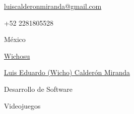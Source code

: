 \documentclass[11pt]{spidercv}
\begin{document}
    \begin{TopBar}{\ColorTextSide}

        \begin{DoubleColumns}
            \begin{ItemList}{\ColorHighlight}
                \item [\Large\faAt] \href{mailto:email@example.com}{luiscalderonmiranda@gmail.com}
                \item [\Large\faMobile] +52 2281805528
                \item [\Large\faMapMarker] México
            \end{ItemList}
            \nextcolumn
            \begin{ItemList}{\ColorHighlight}
                \item [\Large\faGithub] \href{https://github.com/Wichosu}{Wichosu}
                \item [\Large\faLinkedinSquare] \href{https://www.linkedin.com/in/luis-eduardo-calderón-miranda-2324b2204/}{Luis Eduardo (Wicho) Calderón Miranda}
            \end{ItemList}
        \end{DoubleColumns}

        \begin{TripleColumns}
            \begin{ItemList}{\ColorHighlight}
                \item [] Desarrollo de Software
            \end{ItemList}
            \nextcolumn
            \begin{ItemList}{\ColorHighlight}
                \item [] Videojuegos
            \end{ItemList}
            \nextcolumn
        \end{TripleColumns}
    \end{TopBar}
\end{document}
